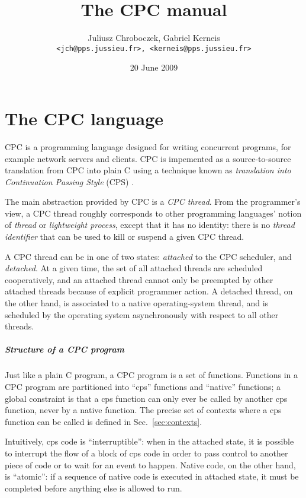 \documentclass[a4paper]{report}
\title{The CPC manual}
\author{Juliusz Chroboczek, Gabriel Kerneis\\
{\tt <jch@pps.jussieu.fr>, <kerneis@pps.jussieu.fr>}}
\date{20 June 2009}
\begin{document}
\maketitle

\chapter{The CPC language} \label{chapter:language}

CPC is a programming language designed for writing concurrent programs, for
example network servers and clients.  CPC is impemented as a
source-to-source translation from CPC into plain C using a technique known
as {\em translation into Continuation Passing Style\/} (CPS)
\cite{strachey:continuations, plotkin:call-by-lambda}.

The main abstraction provided by CPC is a {\em CPC thread}.  From the
programmer's view, a CPC thread roughly corresponds to other programming
languages' notion of {\em thread\/} or {\em lightweight process}, except
that it has no identity: there is no {\em thread identifier\/} that can be
used to kill or suspend a given CPC thread.

A CPC thread can be in one of two states: {\em attached\/} to the CPC
scheduler, and {\em detached}.  At a given time, the set of all attached
threads are scheduled cooperatively, and an attached thread cannot only be
preempted by other attached threads because of explicit programmer action.
A detached thread, on the other hand, is associated to a native
operating-system thread, and is scheduled by the operating system
asynchronously with respect to all other threads.

\paragraph{Structure of a CPC program}

Just like a plain C program, a CPC program is a set of functions.
Functions in a CPC program are partitioned into ``cps'' functions and
``native'' functions; a global constraint is that a cps function can
only ever be called by another cps function, never by a native
function.  The precise set of contexts where a cps function can be
called is defined in Sec.~\ref{sec:contexts}.

Intuitively, cps code is ``interruptible'': when in the attached state, it
is possible to interrupt the flow of a block of cps code in order to pass
control to another piece of code or to wait for an event to happen.  Native
code, on the other hand, is ``atomic'': if a sequence of native code is
executed in attached state, it must be completed before anything else is
allowed to run.
\end{document}
